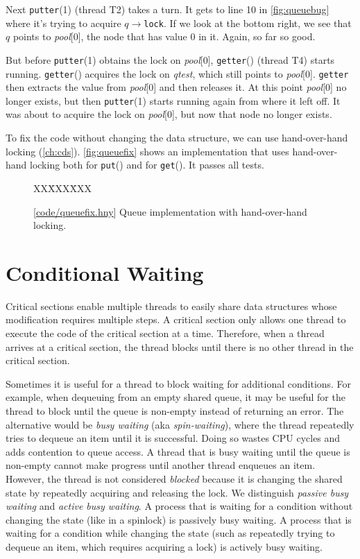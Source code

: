 \documentclass{report}
\newcommand{\harmonysource}[1]{
\begin{tabbing}
XX\=XXX\=XXX\kill
    
\end{tabbing}
}
\newcommand{\harmonylink}[1]{%
[\href{https://harmony.cs.cornell.edu/#1}{\underline{#1}}]%
}
\newenvironment{code}{
\tcolorbox
}{
\endtcolorbox
}
\begin{document}
Next \texttt{putter}(1) (thread T2) takes a turn.  It gets to line 10 in
\autoref{fig:queuebug} where it's trying to acquire
$q$$\rightarrow$\texttt{lock}.  If we look at the bottom right,
we see that $q$ points to \textit{pool}[0], the node that has value 0
in it.  Again, so far so good.

But before \texttt{putter}(1) obtains
the lock on \textit{pool}[0], \texttt{getter}() (thread T4) starts
running.  \texttt{getter}() acquires the lock on \textit{qtest}, which
still points to \textit{pool}[0].  \texttt{getter} then extracts the
value from \textit{pool}[0] and then releases it.
At this point \textit{pool}[0] no longer exists, but then
\texttt{putter}(1) starts running again from where it left off.
It was about to acquire the lock on \textit{pool}[0], but now that
node no longer exists.

To fix the code without changing the data structure, we can use
hand-over-hand locking (\autoref{ch:cds}).
\autoref{fig:queuefix} shows an implementation
that uses hand-over-hand locking
both for \texttt{put}() and for \texttt{get}().  It passes all tests.

\begin{figure}
\begin{code}
\harmonysource{queuefix}
\end{code}
\caption{\harmonylink{code/queuefix.hny} Queue implementation with hand-over-hand locking.}
\label{fig:queuefix}
\end{figure}

\chapter{Conditional Waiting}
\label{ch:condwait}

Critical sections enable multiple threads
to easily share data structures whose modification
requires multiple steps.
A critical section only allows one thread to execute the code
of the critical section at a time.
Therefore, when a thread arrives at a critical section,
the thread blocks until there is no other thread in the critical section.

%
%
Sometimes it is useful for a thread to block waiting for additional
conditions.
For example, when dequeuing from an empty shared queue,
it may be useful for the thread to block until the queue is non-empty
instead of returning an error.
The alternative would be \emph{busy waiting} (aka \emph{spin-waiting}),
where the thread repeatedly tries to dequeue an item until it is successful.
Doing so wastes CPU cycles and adds contention to queue access.
%
A thread that is busy waiting until the queue is non-empty cannot
make progress until another thread enqueues an item.
However, the thread is not considered \emph{blocked} because it is
changing the shared state by repeatedly acquiring and releasing the
lock.
We distinguish \emph{passive busy waiting} and \emph{active busy waiting}.
A process that is waiting for a condition without changing the state
(like in a spinlock) is passively busy waiting.
A process that is waiting for a condition while changing the state
(such as repeatedly trying to dequeue an item, which requires
acquiring a lock) is actively busy waiting.
\end{document}

